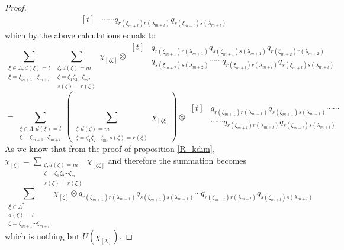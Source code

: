 \documentclass{amsart}
\theoremstyle{plain}
\theoremstyle{definition}
\theoremstyle{remark}
\numberwithin{equation}{section}
\begin{document}
\begin{proof}
\begin{equation*}
\begin{aligned}[t]
        &\cdots\cdots
        q_{r(\xi_{m+l})r(\lambda_{m+l})}q_{s(\xi_{m+l})s(\lambda_{m+l})}
    \end{aligned}
\end{equation*}
which by the above calculations equals to
\begin{equation*}
    \sum\limits_{\substack{\xi\in \Lambda, d(\xi)=l \\ \xi=\xi_{m+1}\cdots\xi_{m+l}}}\sum\limits_{\substack{\zeta, d(\zeta)=m\\ \zeta=\zeta_{1}\zeta_{2}\cdots\zeta_{m}, \\ s(\zeta)=r(\xi)}}\chi_{[\zeta\xi]}\otimes
    \begin{aligned}[t]
&q_{r(\xi_{m+1})r(\lambda_{m+1})}q_{s(\xi_{m+1})s(\lambda_{m+1})}q_{r(\xi_{m+2})r(\lambda_{m+2})} \\
&q_{s(\xi_{m+2})s(\lambda_{m+2})}\cdots\cdots q_{r(\xi_{m+l})r(\lambda_{m+l})}q_{s(\xi_{m+l})s(\lambda_{m+l})}
    \end{aligned}
\end{equation*}
\begin{equation*}
    =\sum\limits_{\substack{\xi\in \Lambda, d(\xi)=l \\ \xi=\xi_{m+1}\cdots\xi_{m+l}}}\left(\sum\limits_{\substack{\zeta, d(\zeta)=m\\ \zeta=\zeta_{1}\zeta_{2}\cdots\zeta_{m}, s(\zeta)=r(\xi)}}\chi_{[\zeta\xi]}\right)\otimes 
    \begin{aligned}[t]
        &q_{r(\xi_{m+1})r(\lambda_{m+1})}q_{s(\xi_{m+1})s(\lambda_{m+1})}\cdots\cdots \\
        &\cdots
        \cdots q_{r(\xi_{m+l})r(\lambda_{m+l})}q_{s(\xi_{m+l})s(\lambda_{m+l})}
    \end{aligned}
\end{equation*}
As we know that from the proof of proposition \ref{R_kdim}, $\chi_{[\xi]}=\sum\limits_{\substack{\zeta, d(\zeta)=m\\ \zeta=\zeta_{1}\zeta_{2}\cdots\zeta_{m}\\ s(\zeta)=r(\xi)}}\chi_{[\zeta\xi]}$ and therefore the summation becomes
\begin{equation*}
    \sum\limits_{\substack{\xi\in \Lambda^{*}\\ d(\xi)=l \\ \xi=\xi_{m+1}\cdots\xi_{m+l}}}\chi_{[\xi]}\otimes q_{r(\xi_{m+1})r(\lambda_{m+1})}q_{s(\xi_{m+1})s(\lambda_{m+1})}\cdots q_{r(\xi_{m+l})r(\lambda_{m+l})}q_{s(\xi_{m+l})s(\lambda_{m+l})}
\end{equation*}
which is nothing but $U(\chi_{[\lambda]})$.

\end{proof}
\end{document}
